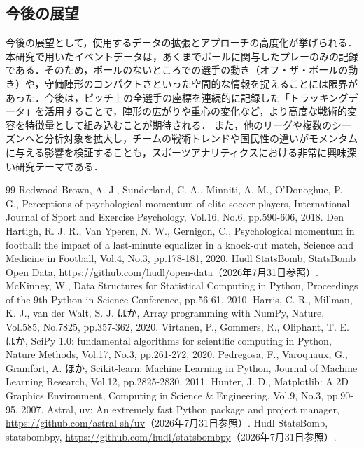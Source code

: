 \documentclass[11pt]{ujarticle} %
\begin{document}
\subsection{今後の展望}
今後の展望として，使用するデータの拡張とアプローチの高度化が挙げられる．本研究で用いたイベントデータは，あくまでボールに関与したプレーのみの記録である．そのため，ボールのないところでの選手の動き（オフ・ザ・ボールの動き）や，守備陣形のコンパクトさといった空間的な情報を捉えることには限界があった．今後は，ピッチ上の全選手の座標を連続的に記録した「トラッキングデータ」を活用することで，陣形の広がりや重心の変化など，より高度な戦術的変容を特徴量として組み込むことが期待される．
また，他のリーグや複数のシーズンへと分析対象を拡大し，チームの戦術トレンドや国民性の違いがモメンタムに与える影響を検証することも，スポーツアナリティクスにおける非常に興味深い研究テーマである．


\begin{thebibliography}{99}
  Redwood-Brown, A. J., Sunderland, C. A., Minniti, A. M., O'Donoghue, P. G., Perceptions of psychological momentum of elite soccer players, International Journal of Sport and Exercise Psychology, Vol.16, No.6, pp.590-606, 2018.
  Den Hartigh, R. J. R., Van Yperen, N. W., Gernigon, C., Psychological momentum in football: the impact of a last-minute equalizer in a knock-out match, Science and Medicine in Football, Vol.4, No.3, pp.178-181, 2020.
  Hudl StatsBomb, StatsBomb Open Data, \url{https://github.com/hudl/open-data}（2026年7月31日参照）.
  McKinney, W., Data Structures for Statistical Computing in Python, Proceedings of the 9th Python in Science Conference, pp.56-61, 2010.
  Harris, C. R., Millman, K. J., van der Walt, S. J. ほか, Array programming with NumPy, Nature, Vol.585, No.7825, pp.357-362, 2020.
  Virtanen, P., Gommers, R., Oliphant, T. E. ほか, SciPy 1.0: fundamental algorithms for scientific computing in Python, Nature Methods, Vol.17, No.3, pp.261-272, 2020.
  Pedregosa, F., Varoquaux, G., Gramfort, A. ほか, Scikit-learn: Machine Learning in Python, Journal of Machine Learning Research, Vol.12, pp.2825-2830, 2011.
  Hunter, J. D., Matplotlib: A 2D Graphics Environment, Computing in Science \& Engineering, Vol.9, No.3, pp.90-95, 2007.
  Astral, uv: An extremely fast Python package and project manager, \url{https://github.com/astral-sh/uv}（2026年7月31日参照）.
  Hudl StatsBomb, statsbombpy, \url{https://github.com/hudl/statsbombpy}（2026年7月31日参照）.
\end{thebibliography}

\clearpage

\end{document}

